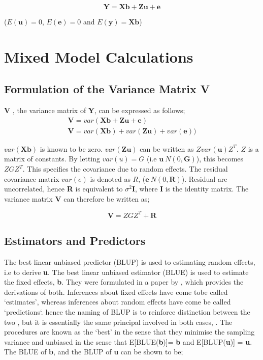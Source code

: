 \documentclass[12pt, a4paper]{report}
\theoremstyle{plain}
\theoremstyle{definition}
\theoremstyle{remark}
\begin{document}
\begin{equation}
\textbf{Y} = \textbf{Xb} + \textbf{Zu} + \textbf{e}
\end{equation}

($E(\textbf{u})=0$, $E(\textbf{e})=0 $ and $E(\textbf{y}) =
\textbf{Xb}$)

\section{Mixed Model Calculations}
\subsection{Formulation of the Variance Matrix V}
\textbf{V} , the variance matrix of \textbf{Y}, can be expressed
as follows;
\begin{eqnarray}
\textbf{V}= var ( \textbf{Xb} + \textbf{Zu} + \textbf{e})\\
\textbf{V}= var ( \textbf{Xb} ) + var (\textbf{Zu}) +
var(\textbf{e}))
\end{eqnarray}


$var(\textbf{Xb})$ is known to be zero. $var(\textbf{Zu})$ can be
written as $Zvar(\textbf{u})Z^{T}$. $Z$ is a matrix of constants.
By letting $var(u) = G$ (i.e $\textbf{u} ~ N(0,\textbf{G})$), this
becomes $ZGZ^{T}$. This specifies the covariance due to random
effects. The residual covariance matrix $var(e)$ is denoted as
$R$, ($\textbf{e} ~ N(0,\textbf{R})$). Residual are uncorrelated,
hence \textbf{R} is equivalent to $\sigma^{2}$\textbf{I}, where
\textbf{I} is the identity matrix. The variance matrix \textbf{V}
can therefore be written as;

\begin{equation}
\textbf{V}  = ZGZ^{T} + \textbf{R}
\end{equation}

\subsection{Estimators and Predictors}

The best linear unbiased predictor (BLUP) is used to estimating
random effects, i.e to derive \textbf{u}. The best linear unbiased
estimator (BLUE) is used to estimate the fixed effects,
\textbf{b}. They were formulated in a paper by \cite{Henderson59},
which provides the derivations of both. Inferences about fixed
effects have come tobe called `estimates', whereas inferences
about random effects have come be called `predictions`. hence the
naming of BLUP is to reinforce distinction between the two , but
it is essentially the same principal involved in both cases,
\citep{Robinson}. The procedures are known as the `best' in the
sense that they minimise the sampling variance and unbiased in the
sense that E[BLUE(\textbf{b})]= \textbf{b} and E[BLUP(\textbf{u})]
= \textbf{u}. The BLUE of \textbf{b}, and the BLUP of \textbf{u}
can be shown to be;
\end{document}
